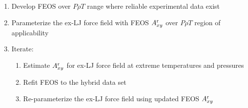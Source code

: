 \documentclass[11pt,a4paper]{article}
\begin{document}
\begin{enumerate}
	\item Develop FEOS over $P \rho T$ range where reliable experimental data exist
	\item Parameterize the ex-LJ force field with FEOS $A_{xy}^{\rm r}$ over $P \rho T$ region of applicability
	\item Iterate:
	\begin{enumerate}
		\item Estimate $A_{xy}^{\rm r}$ for ex-LJ force field at extreme temperatures and pressures
		\item Refit FEOS to the hybrid data set
		\item Re-parameterize the ex-LJ force field using updated FEOS $A_{xy}^{\rm r}$
	\end{enumerate}
\end{enumerate}






\end{document}
